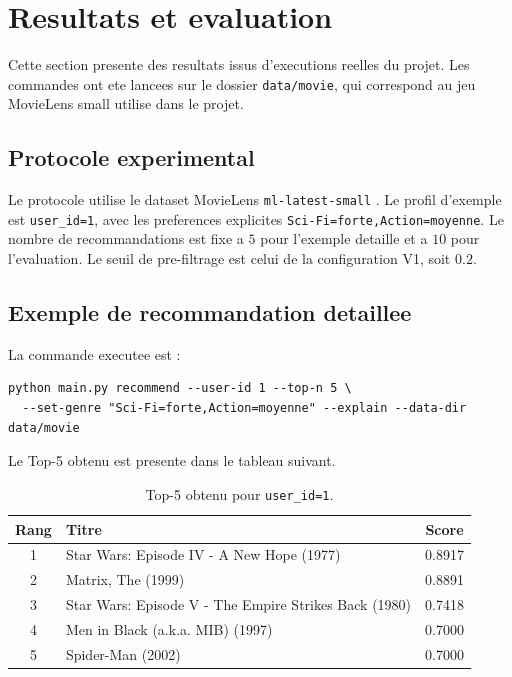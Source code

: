 \section{Resultats et evaluation}

Cette section presente des resultats issus d'executions reelles du projet. Les commandes ont ete lancees sur le dossier \texttt{data/movie}, qui correspond au jeu MovieLens small utilise dans le projet.

\subsection{Protocole experimental}

Le protocole utilise le dataset MovieLens \texttt{ml-latest-small} \cite{harper2015}. Le profil d'exemple est \texttt{user\_id=1}, avec les preferences explicites \texttt{Sci-Fi=forte,Action=moyenne}. Le nombre de recommandations est fixe a $5$ pour l'exemple detaille et a $10$ pour l'evaluation. Le seuil de pre-filtrage est celui de la configuration V1, soit $0.2$.

\subsection{Exemple de recommandation detaillee}

La commande executee est :
\begin{verbatim}
python main.py recommend --user-id 1 --top-n 5 \
  --set-genre "Sci-Fi=forte,Action=moyenne" --explain --data-dir data/movie
\end{verbatim}

Le Top-5 obtenu est presente dans le tableau suivant.

\begin{table}[H]
\centering
\caption{Top-5 obtenu pour \texttt{user\_id=1}.}
\label{tab:top5}
\small
\begin{tabular}{@{}clc@{}}
\toprule
Rang & Titre & Score \\
\midrule
1 & Star Wars: Episode IV - A New Hope (1977) & 0.8917 \\
2 & Matrix, The (1999) & 0.8891 \\
3 & Star Wars: Episode V - The Empire Strikes Back (1980) & 0.7418 \\
4 & Men in Black (a.k.a. MIB) (1997) & 0.7000 \\
5 & Spider-Man (2002) & 0.7000 \\
\bottomrule
\end{tabular}
\end{table}

